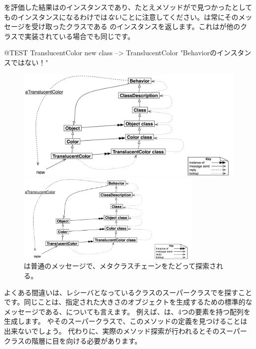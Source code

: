 \documentclass[a4paper,10pt,twoside]{book}
\begin{document}
を評価した結果はのインスタンスであり、たとえメソッドがで見つかったとしてものインスタンスになるわけでは\emph{ない}ことに注意してください。は常にそのメッセージを受け取ったクラスである \self のインスタンスを返します。これはが他のクラスで実装されている場合でも同じです。

\begin{code}{@TEST}
TranslucentColor new class --> TranslucentColor    "Behaviorのインスタンスではない！"
\end{code}

\begin{center}
\begin{figure}
\ifluluelse
	{\centerline{\includegraphics[width=\textwidth]{TranslucentSendingNew}}}
	{\centerline{\includegraphics[width=0.8\textwidth]{TranslucentSendingNew}}}
\caption{は普通のメッセージで、メタクラスチェーンをたどって探索される。}
\end{figure}
\end{center}

よくある間違いは、レシーバとなっているクラスのスーパークラスでを探すことです。同じことは、指定された大きさのオブジェクトを生成するための標準的なメッセージである、についても言えます。
例えば、は、4つの要素を持つ配列を生成します。
やそのスーパークラスで、このメソッドの定義を見つけることは出来ないでしょう。
代わりに、実際のメソッド探索が行われるとそのスーパークラスの階層に目を向ける必要があります。
\end{document}
